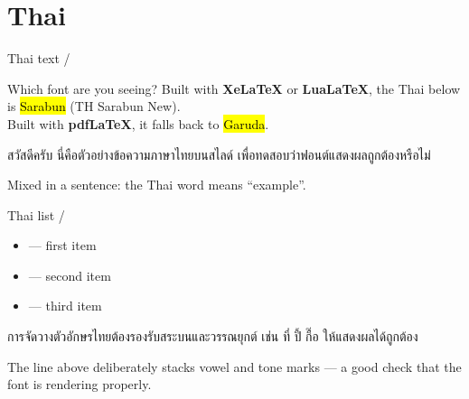 \section{Thai}

\begin{frame}{Thai text / }
  \begin{block}{Which font are you seeing?}
    Built with \textbf{XeLaTeX} or \textbf{LuaLaTeX}, the Thai below is
    \hl{Sarabun} (TH Sarabun New).\\
    Built with \textbf{pdfLaTeX}, it falls back to \hl{Garuda}.
  \end{block}

  \begin{thaipar}
    สวัสดีครับ นี่คือตัวอย่างข้อความภาษาไทยบนสไลด์
    เพื่อทดสอบว่าฟอนต์แสดงผลถูกต้องหรือไม่
  \end{thaipar}

  \vspace{0.6em}
  Mixed in a sentence: the Thai word  means ``example''.
\end{frame}

\begin{frame}{Thai list / }
  \begin{itemize}
    \item {} --- first item
    \item {} --- second item
    \item {} --- third item
  \end{itemize}

  \vspace{0.6em}
  \begin{thaipar}
    การจัดวางตัวอักษรไทยต้องรองรับสระบนและวรรณยุกต์
    เช่น ที่ ปี้ กื๊อ ให้แสดงผลได้ถูกต้อง
  \end{thaipar}

  \vspace{0.4em}
  {\scriptsize\color{BrandMuted}The line above deliberately stacks vowel and
  tone marks --- a good check that the font is rendering properly.}
\end{frame}

